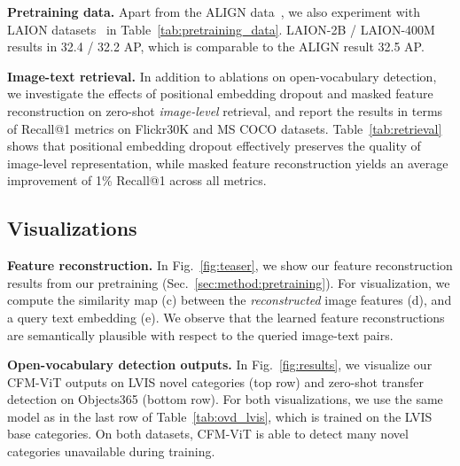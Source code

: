\documentclass[10pt,twocolumn,letterpaper]{article}
\newcommand{\figref}[1]{Fig.~\ref{#1}}
\newcommand{\tabref}[1]{Table~\ref{#1}}
\newcommand{\secref}[1]{Sec.~\ref{#1}}
\renewcommand{\paragraph}[1]{\vspace{1mm}\noindent\textbf{#1}}
\newcommand{\ours}{CFM-ViT\xspace}
\begin{document}
\paragraph{Pretraining data.}\quad
Apart from the ALIGN data~\cite{align}, we also experiment with LAION datasets~\cite{schuhmann2021laion} in \tabref{tab:pretraining_data}. LAION-2B / LAION-400M results in 32.4 / 32.2 AP, which is comparable to the ALIGN result 32.5 AP.



\paragraph{Image-text retrieval.}\quad
In addition to ablations on open-vocabulary detection, we investigate the effects of positional embedding dropout and masked feature reconstruction on zero-shot \textit{image-level} retrieval, and report the results in terms of Recall@1 metrics on Flickr30K and MS COCO datasets. \tabref{tab:retrieval} shows that positional embedding dropout effectively preserves the quality of image-level representation, while masked feature reconstruction yields an average improvement of 1\% Recall@1 across all metrics.



\vspace{-1mm}
\subsection{Visualizations}
\vspace{-1mm}
\paragraph{Feature reconstruction.}\quad
In \figref{fig:teaser}, we show our feature reconstruction results from our pretraining (\secref{sec:method:pretraining}). For visualization, we compute the similarity map (c) between the \textit{reconstructed} image features (d), and a query text embedding (e). We observe that the learned feature reconstructions are semantically plausible with respect to the queried image-text pairs.


\paragraph{Open-vocabulary detection outputs.}\quad
In \figref{fig:results}, we visualize our \ours outputs on LVIS novel categories (top row) and zero-shot transfer detection on Objects365 (bottom row). For both visualizations, we use the same model as in the last row of \tabref{tab:ovd_lvis}, which is trained on the LVIS base categories. On both datasets, \ours is able to detect many novel categories unavailable during training.
 \vspace{-1mm}
\end{document}
